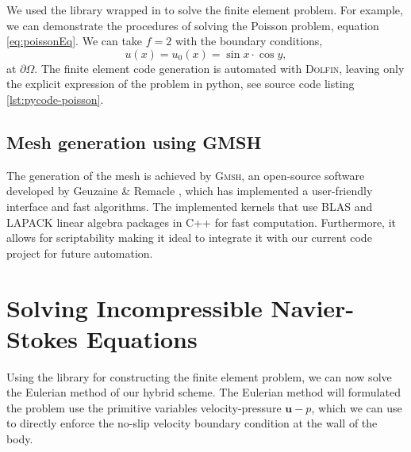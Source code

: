 We used the \dolfin library wrapped in \python to solve the finite element problem. For example, we can demonstrate the procedures of solving the Poisson problem, equation \ref{eq:poissonEq}. We can take $f=2$ with the boundary conditions,
	\begin{equation}
	u(x) = u_0(x) = \sin x \cdot \cos y,
	\end{equation}
at $\partial \Omega$. The finite element code generation is automated with \textsc{Dolfin}, leaving only the explicit expression of the problem in python, see source code listing \ref{lst:pycode-poisson}.

\subsection{Mesh generation using GMSH}
\label{subsec:mgugmsh}

The generation of the mesh is achieved by \textsc{Gmsh}, an open-source software developed by Geuzaine \& Remacle \cite{Geuzaine2009b}, which has implemented a user-friendly interface and fast algorithms. The \gmsh implemented kernels that use \textsc{BLAS} and LAPACK linear algebra packages in C++ for fast computation. Furthermore, it allows for scriptability making it ideal to integrate it with our current \python code project for future automation.

\section{Solving Incompressible Navier-Stokes Equations}
Using the \dolfin library for constructing the finite element problem, we can now solve the Eulerian method of our hybrid scheme. The Eulerian method will formulated the problem use the primitive variables velocity-pressure $\mathbf{u}-p$, which we can use to directly enforce the no-slip velocity boundary condition at the wall of the body. 

